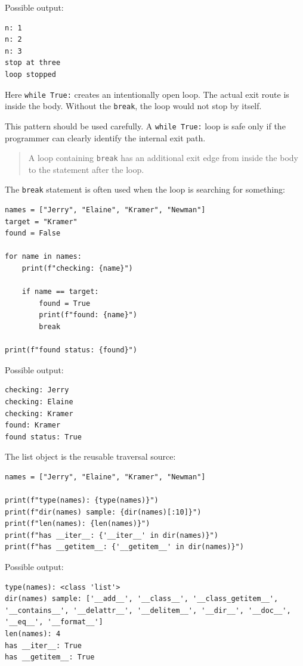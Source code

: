 Possible output:

\begin{verbatim}
n: 1
n: 2
n: 3
stop at three
loop stopped
\end{verbatim}

Here \texttt{while True:} creates an intentionally open loop. The actual exit route is inside the body. Without the \texttt{break}, the loop would not stop by itself.

This pattern should be used carefully. A \texttt{while True:} loop is safe only if the programmer can clearly identify the internal exit path.

\begin{quote}
A loop containing \texttt{break} has an additional exit edge from inside the body to the statement after the loop.
\end{quote}

The \texttt{break} statement is often used when the loop is searching for something:

\begin{verbatim}
names = ["Jerry", "Elaine", "Kramer", "Newman"]
target = "Kramer"
found = False

for name in names:
    print(f"checking: {name}")

    if name == target:
        found = True
        print(f"found: {name}")
        break

print(f"found status: {found}")
\end{verbatim}

Possible output:

\begin{verbatim}
checking: Jerry
checking: Elaine
checking: Kramer
found: Kramer
found status: True
\end{verbatim}

The list object is the reusable traversal source:

\begin{verbatim}
names = ["Jerry", "Elaine", "Kramer", "Newman"]

print(f"type(names): {type(names)}")
print(f"dir(names) sample: {dir(names)[:10]}")
print(f"len(names): {len(names)}")
print(f"has __iter__: {'__iter__' in dir(names)}")
print(f"has __getitem__: {'__getitem__' in dir(names)}")
\end{verbatim}

Possible output:

\begin{verbatim}
type(names): <class 'list'>
dir(names) sample: ['__add__', '__class__', '__class_getitem__',
'__contains__', '__delattr__', '__delitem__', '__dir__', '__doc__',
'__eq__', '__format__']
len(names): 4
has __iter__: True
has __getitem__: True
\end{verbatim}

